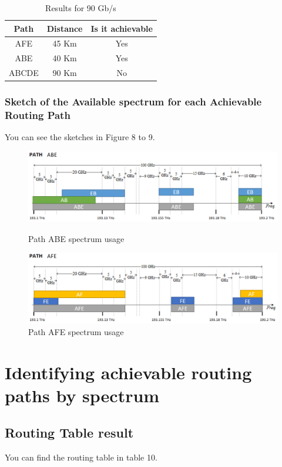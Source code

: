\documentclass{article}
\begin{document}
\begin{table}[htb!]
    \centering
    \begin{tabular}{|c|c|c|}
    \hline
         Path & Distance & Is it achievable \\ \hline
         AFE & 45 Km & Yes \\ \hline
         ABE & 40 Km & Yes \\ \hline
         ABCDE & 90 Km & No\\ \hline

    \end{tabular}
    \caption{Results for 90 Gb/s}
\end{table}

\subsubsection{Sketch of the Available spectrum for each Achievable Routing Path}
You can see the sketches in Figure 8 to 9.

\begin{figure}[htb!]
    \centering
    \includegraphics[scale=0.5]{spectrum-path-abe}
    \caption{Path ABE spectrum usage}
    \includegraphics[scale=0.5]{spectrum-path-afe}
    \caption{Path AFE spectrum usage}
\end{figure}

\section{Identifying achievable routing paths by spectrum}
\setcounter{subsection}{4}
\subsection{Routing Table result}
You can find the routing table in table 10.
\end{document}
